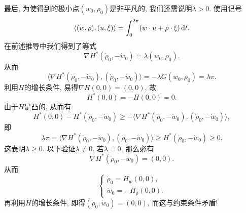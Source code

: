 最后, 为使得到的极小点$(w_0, \rho_0)$是非平凡的, 我们还需说明$\lambda > 0$.
使用记号 
\begin{equation*}
    \langle (w, \rho), (u, \xi)\rangle = \int_0^{2\pi}(w \cdot u + \rho \cdot \xi) \,{\rm d}t.
\end{equation*}
在前述推导中我们得到了等式 
\begin{equation*}
    \nabla H^*(\dot \rho_0, -\dot w_0) = \lambda(w_0, \rho_0).
\end{equation*}
从而 
\begin{equation*}
    \langle \nabla H^*(\dot \rho_0, -\dot w_0), (\dot\rho_0, -\dot w_0)\rangle = -\lambda G(w_0, \rho_0) = \lambda\pi.
\end{equation*}
利用$H$的增长条件, 易得$\nabla H(0, 0) = (0, 0)$, 故 
\begin{equation*}
    H^*(0, 0) = -H(0, 0) = 0.
\end{equation*}
由于$H$是凸的, 从而有 
\begin{equation*}
    H^*(0, 0) - H^*(\dot\rho_0, -\dot w_0) \geq -\langle \nabla H^*(\dot\rho_0, -\dot w_0), (\dot \rho_0, -\dot w_0)\rangle,
\end{equation*}
即 
\begin{equation*}
    \lambda\pi = \langle \nabla H^*(\dot\rho_0, -\dot w_0), (\dot \rho_0, -\dot w_0)\rangle \geq H^*(\dot\rho_0, -\dot w_0) \geq 0.
\end{equation*}
这表明$\lambda \geq 0$. 以下验证$\lambda \neq 0$. 若$\lambda = 0$, 那么必有 
\begin{equation*}
    \nabla H^*(\dot\rho_0, -\dot w_0) = (0, 0).
\end{equation*}
从而 
\begin{equation*}
    \begin{cases}
        \dot\rho_0 = H_w(0, 0), \\ 
        \dot w_0 = -H_{\rho}(0, 0).
    \end{cases}
\end{equation*}
再利用$H$的增长条件, 即得$(\dot\rho_0, \dot w_0) = (0, 0)$, 而这与约束条件矛盾!
